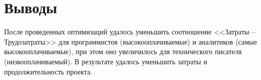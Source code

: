 \chapter{Выводы}

После проведенных оптимизаций удалось уменьшить соотношение <<Затраты---Трудозатраты>> для программистов (высокооплачиваемые) и аналитиков (самые высокооплачиваемые), при этом оно увеличилось для технического писателя (низкооплачиваемый). В результате удалось уменьшить затраты и продолжительность проекта.